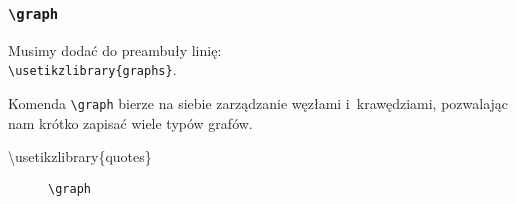 \documentclass[10pt,t]{beamer}  %
\begin{document}
\begin{frame}
  \frametitle{\texttt{\textbackslash graph}}


  Musimy dodać do preambuły linię: \\
  \texttt{\textbackslash usetikzlibrary\{graphs\}}.

  Komenda \texttt{\textbackslash graph} bierze na siebie zarządzanie
  węzłami i~krawędziami, pozwalając nam krótko zapisać wiele typów
  grafów.

  \textbackslash usetikzlibrary\{quotes\}


  \begin{figure}

    \centering


    \caption{\texttt{\textbackslash graph}}

  \end{figure}

\end{frame}
\end{document}
